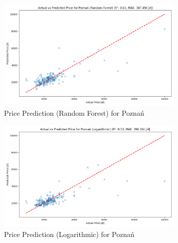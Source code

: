 \begin{figure}[H]
    \centering
    \includegraphics[width=0.8\textwidth]{figures/poznan_price_prediction_rf.png}
    \caption{Price Prediction (Random Forest) for Poznań}
\end{figure}
\begin{figure}[H]
    \centering
    \includegraphics[width=0.8\textwidth]{figures/poznan_price_prediction_logarithmic.png}
    \caption{Price Prediction (Logarithmic) for Poznań}
\end{figure}

